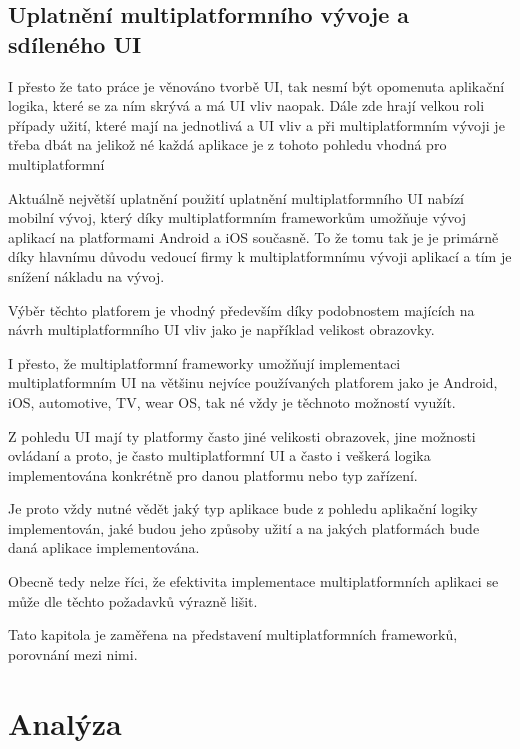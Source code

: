 \section{Uplatnění multiplatformního vývoje a sdíleného UI}

I přesto že tato práce je věnováno tvorbě UI, tak nesmí být opomenuta aplikační logika, které se za ním skrývá a má UI vliv naopak. Dále zde
hrají velkou roli případy užití, které mají na jednotlivá a UI vliv a při multiplatformním vývoji je třeba dbát na jelikož né každá aplikace
je z tohoto pohledu vhodná pro multiplatformní


Aktuálně největší uplatnění použití uplatnění multiplatformního UI nabízí mobilní vývoj, který díky multiplatformním frameworkům umožňuje vývoj
aplikací na platformami Android a iOS současně. 
To že tomu tak je je primárně díky hlavnímu důvodu vedoucí firmy k multiplatformnímu vývoji aplikací a tím je snížení nákladu na vývoj.

Výběr těchto platforem je vhodný především díky podobnostem majících na návrh multiplatformního UI vliv jako je například velikost obrazovky.

I přesto, že multiplatformní frameworky umožňují implementaci multiplatformním UI na většinu nejvíce používaných platforem jako je Android, iOS,
automotive, TV, wear OS, tak né vždy je těchnoto možností využít.

Z pohledu UI mají ty platformy často jiné velikosti obrazovek, jine možnosti ovládaní a proto, je často multiplatformní UI a často i veškerá logika
implementována konkrétně pro danou platformu nebo typ zařízení.

Je proto vždy nutné vědět jaký typ aplikace bude z pohledu aplikační logiky implementován, jaké budou jeho způsoby užití a na jakých platformách
bude daná aplikace implementována.

Obecně tedy nelze říci, že efektivita implementace multiplatformních aplikaci se může dle těchto požadavků výrazně lišit.






Tato kapitola je zaměřena na představení multiplatformních frameworků, porovnání mezi nimi. 


\chapter{Analýza}

